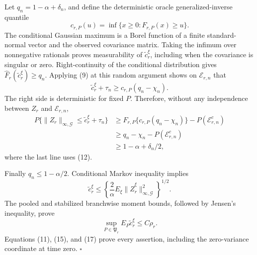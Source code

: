 Let \(q_n=1-\alpha+\delta_n\), and define the deterministic oracle generalized-inverse quantile
\[
 c_{r,P}(u)=\inf\{x\ge0:F_{r,P}(x)\ge u\}.             \tag{13}
\]
The conditional Gaussian maximum is a Borel function of a finite standard-normal vector and the observed covariance matrix.  Taking the infimum over nonnegative rationals proves measurability of \(\widetilde c_r^\xi\), including when the covariance is singular or zero.  Right-continuity of the conditional distribution gives
\(\widehat F_r(\widetilde c_r^\xi)\ge q_n\).  Applying (9) at this random argument shows on \(\mathcal E_{r,n}\) that
\[
 \widetilde c_r^\xi+\tau_n
 \ge c_{r,P}(q_n-\chi_n).                               \tag{14}
\]
The right side is deterministic for fixed \(P\).  Therefore, without any independence between \(Z_r\) and \(\mathcal E_{r,n}\),
\[
\begin{aligned}
 P\{\|Z_r\|_{\infty,\mathcal G}
       \le\widetilde c_r^\xi+\tau_n\}
 &\ge F_{r,P}\{c_{r,P}(q_n-\chi_n)\}
       -P(\mathcal E_{r,n}^c)\\
 &\ge q_n-\chi_n-P(\mathcal E_{r,n}^c)\\
 &\ge1-\alpha+\delta_n/2,
\end{aligned}                                           \tag{15}
\]
where the last line uses (12).

Finally \(q_n\le1-\alpha/2\).  Conditional Markov inequality implies
\[
 \widetilde c_r^\xi
 \le\left\{\frac2\alpha E_\xi
 \|\widehat Z_r^\xi\|_{\infty,\mathcal G}^2\right\}^{1/2}. \tag{16}
\]
The pooled and stabilized branchwise moment bounds, followed by Jensen's inequality, prove
\[
 \sup_{P\in\mathfrak P_r}E_P\widetilde c_r^\xi\le C\rho_r. \tag{17}
\]
Equations (11), (15), and (17) prove every assertion, including the zero-variance coordinate at time zero. \(\square\)